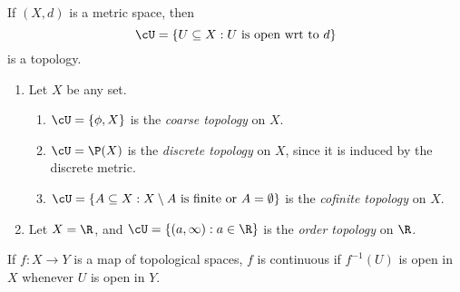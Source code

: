 \documentclass[a4paper]{article}
\begin{document}
\begin{eg}
  If $(X, d)$ is a metric space, then
  \[
    \cU = \{U\subseteq X: U\text{ is open wrt to }d\}
  \]
  is a topology.
\end{eg}

\begin{eg}\leavevmode
  \begin{enumerate}
    \item Let $X$ be any set. 
      \begin{enumerate}
        \item $\cU = \{\phi, X\}$ is the \emph{coarse topology} on $X$.
        \item $\cU = \P(X)$ is the \emph{discrete topology} on $X$, since it is induced by the discrete metric.
        \item $\cU = \{A\subseteq X: X\setminus A\text{ is finite or } A = \emptyset\}$ is the \emph{cofinite topology} on $X$.
      \end{enumerate}
    \item Let $X = \R$, and $\cU = \{(a, \infty): a\in \R\}$ is the \emph{order topology} on $\R$.
  \end{enumerate}
\end{eg}

\begin{defi}
  If $f: X\to Y$ is a map of topological spaces, $f$ is continuous if $f^{-1}(U)$ is open in $X$ whenever $U$ is open in $Y$.
\end{defi}
\end{document}
